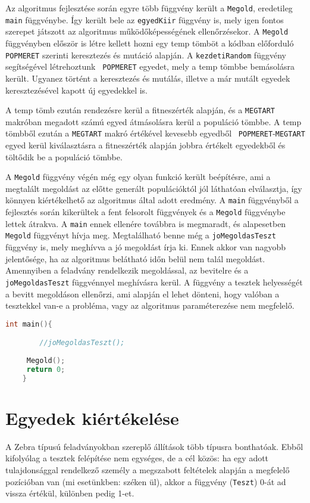 \documentclass[12pt,a4paper,oneside]{report}
\begin{document}
	Az algoritmus fejlesztése során egyre több függvény került a \texttt{Megold}, eredetileg \texttt{main} függvénybe. Így került bele az \texttt{egyedKiir} függvény is, mely igen fontos szerepet játszott az algoritmus működőképességének ellenőrzésekor.
A \texttt{Megold} függvényben először is létre kellett hozni egy temp tömböt a kódban előforduló \texttt{ POPMERET} szerinti keresztezés és mutáció alapján. A \texttt{kezdetiRandom} függvény segítségével létrehoztunk \texttt{ POPMERET} egyedet, mely a temp tömbbe bemásolásra került. 		Ugyanez történt a keresztezés és mutálás, illetve a már mutált egyedek keresztezésével kapott új egyedekkel is. 
	
A temp tömb ezután rendezésre kerül a fitneszérték alapján, és a \texttt{MEGTART}  makróban megadott számú egyed átmásolásra kerül a populáció tömbbe. A temp tömbből ezután a \texttt{MEGTART} makró értékével kevesebb egyedből \texttt{ POPMERET}-\texttt{MEGTART}  egyed kerül kiválasztásra a fitneszérték alapján jobbra értékelt egyedekből és töltődik be a populáció tömbbe.

A \texttt{Megold} függvény végén még egy olyan funkció került beépítésre, ami a megtalált megoldást az előtte generált populációktól jól láthatóan elválasztja, így könnyen kiértékelhető az algoritmus által adott eredmény.
A  \texttt{main} függvényből a fejlesztés során kikerültek a fent felsorolt függvények és a \texttt{Megold} függvénybe lettek átrakva.  A  \texttt{main} ennek ellenére továbbra is megmaradt, és alapesetben \texttt{Megold} függvényt hívja meg. Megtalálható benne még a \texttt{joMegoldasTeszt} függvény is, mely meghívva a jó megoldást írja ki. Ennek akkor van nagyobb jelentősége, ha az algoritmus belátható időn belül nem talál megoldást. Amennyiben a feladvány rendelkezik megoldással, az bevitelre és a \texttt{joMegoldasTeszt} függvénnyel meghívásra kerül. A függvény a tesztek helyességét a bevitt megoldáson ellenőrzi, ami alapján el lehet dönteni, hogy valóban a tesztekkel van-e a probléma, vagy az algoritmus paraméterezése nem megfelelő.

\begin{lstlisting}[frame=single, language=C]
	int main(){

    	//joMegoldasTeszt();
    
   	 Megold();
  	 return 0;
	}

	\end{lstlisting}


    \section{Egyedek kiértékelése} %
	A Zebra típusú feladványokban szereplő állítások több típusra bonthatóak. Ebből kifolyólag a tesztek felépítése nem egységes, de a cél közös: ha egy adott tulajdonsággal rendelkező személy a megszabott feltételek alapján a megfelelő pozícióban van (mi esetünkben: széken ül), akkor a függvény (\texttt{Teszt}) 0-át ad vissza értékül, különben pedig 1-et.
\end{document}
